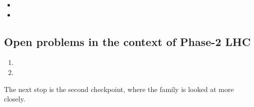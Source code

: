 \begin{pitfalls}
\begin{itemize}[nosep]
  \item {}
  \item {}
\end{itemize}
\end{pitfalls}

\begin{exercises}
\item {}
\item {}
\end{exercises}

\subsection*{Open problems in the context of Phase-2 LHC}
\label{sec:first_checkpoint:open_problems}
\begin{enumerate}
  \item {}
  \item {}
\end{enumerate}
The next stop is the second checkpoint, where the family is looked at more
closely.
